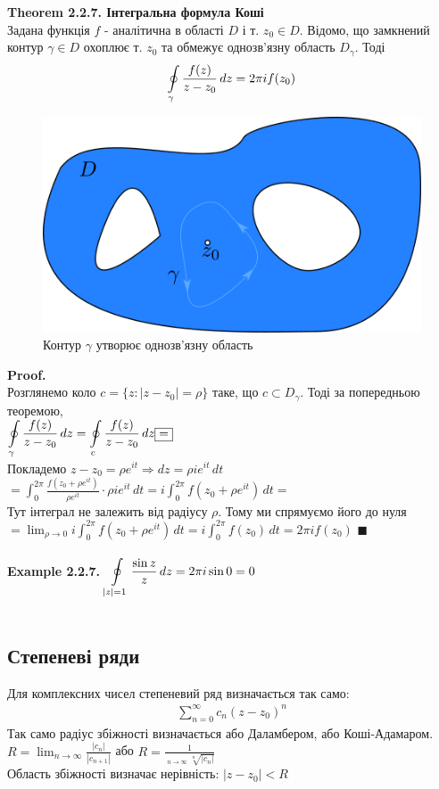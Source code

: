 \documentclass[a4paper, 14pt]{extarticle}
\DeclareMathOperator*\uplim{\overline{lim}}
\def\hugespace{\vspace{5mm} \\}
\begin{document}
	\textbf{Theorem 2.2.7. Інтегральна формула Коші}\\
	Задана функція $f$ - аналітична в області $D$ і т. $z_0 \in D$. Відомо, що замкнений контур $\gamma \in D$ охоплює т. $z_0$ та обмежує однозв'язну область $D_{\gamma}$. Тоді
	\begin{align*}
	\oint\displaylimits_{\gamma} \frac{f(z)}{z-z_0}\,dz = 2 \pi i f(z_0)
	\end{align*}
	\begin{figure}[h]
	\centerline{\includegraphics[scale = 1]{path1376.png}}
	\caption{Контур $\gamma$ утворює однозв'язну область}
	\end{figure}
	\textbf{Proof.}\\
	Розглянемо коло $c = \{ z: |z-z_0|=\rho\}$ таке, що $c \subset D_{\gamma}$. Тоді за попередньою теоремою,\\
	$\displaystyle\oint\displaylimits_{\gamma} \frac{f(z)}{z-z_0}\,dz = \oint\displaylimits_c \frac{f(z)}{z-z_0}\,dz \boxed{=}$\\
	Покладемо $z-z_0=\rho e^{it} \Rightarrow dz=\rho ie^{it}\,dt$\\
	$\displaystyle \boxed{=} \int_{0}^{2\pi} \frac{f(z_0+\rho e^{it})}{\rho e^{it}} \cdot \rho i e^{it} \,dt = i \int_{0}^{2\pi} f(z_0+ \rho e^{it})\,dt \boxed{=}$\\
	Тут інтеграл не залежить від радіусу $\rho$. Тому ми спрямуємо його до нуля\\
	$\displaystyle \boxed{=} \lim_{\rho \to 0} i \int_{0}^{2\pi} f(z_0+ \rho e^{it})\,dt = i \int_{0}^{2\pi} f(z_0)\,dt = 2\pi i f(z_0)$ $\blacksquare$\\
	\hugespace
	\textbf{Example 2.2.7.} $\displaystyle\oint\displaylimits_{|z|=1} \frac{\sin z}{z} \,dz = 2\pi i \sin 0 = 0$\\
	\hugespace
	
	\subsection{Степеневі ряди}
	Для комплексних чисел степеневий ряд визначається так само:
	\begin{align*}
	\sum_{n=0}^{\infty} c_n(z-z_0)^n
	\end{align*}
	Так само радіус збіжності визначається або Даламбером, або Коші-Адамаром.\\
	$R = \displaystyle\lim_{n \to \infty}\frac{|c_n|}{|c_{n+1}|}$ або $R = \displaystyle\frac{1}{\displaystyle\uplim_{n \to \infty} \sqrt[n]{|c_n|}}$\\
	Область збіжності визначає нерівність: $|z-z_0|<R$
	\hugespace
	
\end{document}
